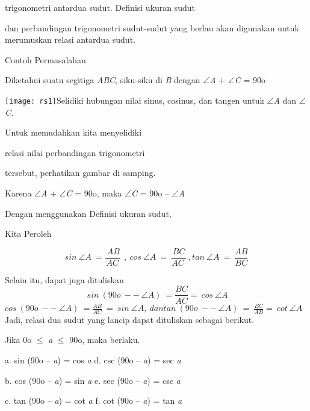 \documentclass[11pt,fleqn]{book} %
\begin{document}
\begin{myEnumerate}
\begin{itemize}
\noindent trigonometri antardua sudut. Definisi ukuran sudut 

\noindent dan perbandingan trigonometri sudut-sudut yang berlau akan digunakan untuk merumuskan relasi antardua sudut.

\noindent Contoh Permasalahan

\noindent Diketahui suatu segitiga \textit{ABC}, siku-siku di \textit{B }dengan $\mathrm{\angle }$\textit{A }+ $\mathrm{\angle }$\textit{C }= 90o

\noindent \texttt{[image: rs1]}Selidiki hubungan nilai sinus, cosinus, dan tangen untuk $\mathrm{\angle }$\textit{A }dan $\mathrm{\angle }$\textit{C.}

\noindent Untuk memudahkan kita menyelidiki

\noindent relasi nilai perbandingan trigonometri

\noindent tersebut, perhatikan gambar di samping.\textbf{}

\noindent Karena $\mathrm{\angle }$\textit{A }+ $\mathrm{\angle }$\textit{C }= 90o, maka $\mathrm{\angle }$\textit{C }= 90o -- $\mathrm{\angle }$\textit{A}

\noindent Dengan menggunakan Definisi ukuran sudut, 

\noindent Kita Peroleh  

\noindent 
\[sin\ \angle A\ =\frac{\ AB}{AC}\ \ ,\ cos\ \angle A\ =\ \frac{BC}{AC\ }\ , tan\ \angle A\ =\ \frac{AB}{BC}\] 


\noindent Selain itu, dapat juga dituliskan
\[\ sin\ (90o\ --\ \angle A)\ =\frac{BC}{AC}=\ cos\ \angle A\] 
$cos\ (90o\ --\ \angle A)\ =\frac{AB}{AC}\ =\ sin\ \angle A,\ dantan\ (90o\ --\ \angle A)\ =\ \frac{BC}{AB}=\ cot\ \angle A$Jadi, relasi dua sudut yang lancip dapat dituliskan sebagai berikut.

\noindent Jika 0o $\mathrm{\le}$ \textit{a }$\mathrm{\le}$ 90o, maka berlaku.

\noindent a. sin (90o -- \textit{a}) = cos \textit{a }  d. csc (90o -- \textit{a}) = sec \textit{a}

\noindent b. cos (90o -- \textit{a}) = sin \textit{a   }e. sec (90o -- \textit{a}) = csc \textit{a}

\noindent c. tan (90o -- \textit{a}) = cot \textit{a   }f. cot (90o -- \textit{a}) = tan \textit{a}

\noindent 

\noindent 

\noindent 


\end{itemize}
\end{myEnumerate}
\end{document}
